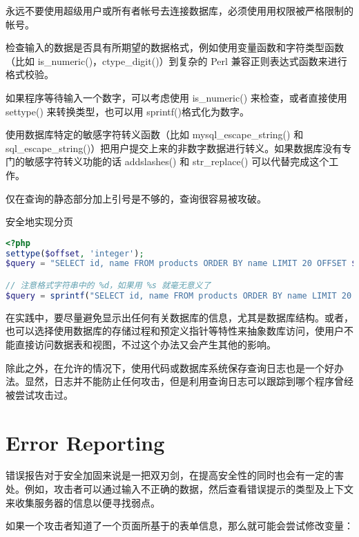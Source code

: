 \begin{compactitem}
\item 永远不要使用超级用户或所有者帐号去连接数据库，必须使用用权限被严格限制的帐号。
\item 检查输入的数据是否具有所期望的数据格式，例如使用变量函数和字符类型函数（比如 is\_numeric()，ctype\_digit()）到复杂的 Perl 兼容正则表达式函数来进行格式校验。
\item 如果程序等待输入一个数字，可以考虑使用 is\_numeric() 来检查，或者直接使用 settype() 来转换类型，也可以用 sprintf()格式化为数字。
\item 使用数据库特定的敏感字符转义函数（比如 mysql\_escape\_string() 和 sql\_escape\_string()）把用户提交上来的非数字数据进行转义。如果数据库没有专门的敏感字符转义功能的话 addslashes() 和 str\_replace() 可以代替完成这个工作。
\end{compactitem}

仅在查询的静态部分加上引号是不够的，查询很容易被攻破。

\begin{example}
安全地实现分页
\begin{lstlisting}[language=PHP]
<?php
settype($offset, 'integer');
$query = "SELECT id, name FROM products ORDER BY name LIMIT 20 OFFSET $offset;";

// 注意格式字符串中的 %d，如果用 %s 就毫无意义了
$query = sprintf("SELECT id, name FROM products ORDER BY name LIMIT 20 OFFSET %d;", $offset);
\end{lstlisting}
\end{example}


在实践中，要尽量避免显示出任何有关数据库的信息，尤其是数据库结构。或者，也可以选择使用数据库的存储过程和预定义指针等特性来抽象数库访问，使用户不能直接访问数据表和视图，不过这个办法又会产生其他的影响。


除此之外，在允许的情况下，使用代码或数据库系统保存查询日志也是一个好办法。显然，日志并不能防止任何攻击，但是利用查询日志可以跟踪到哪个程序曾经被尝试攻击过。


\section{Error Reporting}


错误报告对于安全加固来说是一把双刃剑，在提高安全性的同时也会有一定的害处。例如，攻击者可以通过输入不正确的数据，然后查看错误提示的类型及上下文来收集服务器的信息以便寻找弱点。

如果一个攻击者知道了一个页面所基于的表单信息，那么就可能会尝试修改变量：


